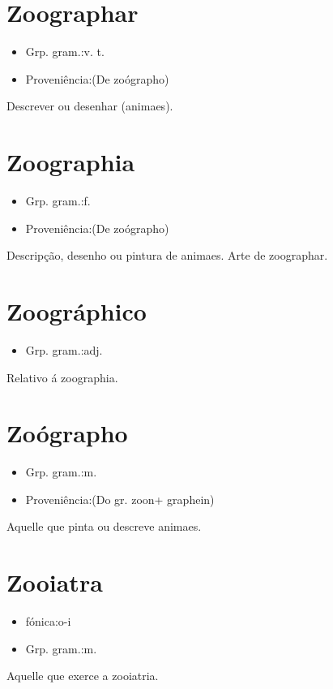 \section{Zoographar}
\begin{itemize}
\item {Grp. gram.:v. t.}
\end{itemize}
\begin{itemize}
\item {Proveniência:(De \textunderscore zoógrapho\textunderscore )}
\end{itemize}
Descrever ou desenhar (animaes).
\section{Zoographia}
\begin{itemize}
\item {Grp. gram.:f.}
\end{itemize}
\begin{itemize}
\item {Proveniência:(De \textunderscore zoógrapho\textunderscore )}
\end{itemize}
Descripção, desenho ou pintura de animaes.
Arte de zoographar.
\section{Zoográphico}
\begin{itemize}
\item {Grp. gram.:adj.}
\end{itemize}
Relativo á zoographia.
\section{Zoógrapho}
\begin{itemize}
\item {Grp. gram.:m.}
\end{itemize}
\begin{itemize}
\item {Proveniência:(Do gr. \textunderscore zoon\textunderscore  + \textunderscore graphein\textunderscore )}
\end{itemize}
Aquelle que pinta ou descreve animaes.
\section{Zooiatra}
\begin{itemize}
\item {fónica:o-i}
\end{itemize}
\begin{itemize}
\item {Grp. gram.:m.}
\end{itemize}
Aquelle que exerce a zooiatria.
